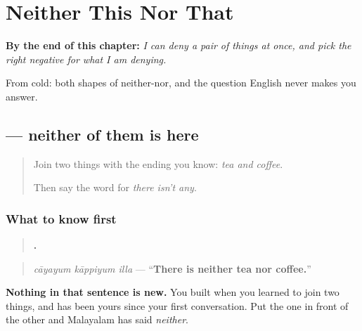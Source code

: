 
\chapter{Neither This Nor That}
\label{ch:ml-neither}

\begin{chapteropening}
\textbf{By the end of this chapter:} \emph{I can deny a pair of things at once, and pick the right negative for what I am denying.}

From cold: both shapes of neither-nor, and the question English never makes you answer.
\end{chapteropening}

\section[\texorpdfstring{\ml{ചായയും} \ml{കാപ്പിയും} \ml{ഇല്ല} (caayayum …)}{ചായയും കാപ്പിയും ഇല്ല (caayayum …)}]{   — neither of them is here}

\label{lesson:ML-C109-neither-here}



\begin{quote}
Join two things with the ending you know: \emph{tea and coffee}.

Then say the word for \emph{there isn't any}.
\end{quote}

\subsection*{What to know first}
\begin{quote}
\textbf{  .}
\end{quote}

\begin{quote}
\emph{cāyayum kāppiyum illa} — \textquotedblleft{}\textbf{There is neither tea nor coffee.}\textquotedblright{}
\end{quote}

\textbf{Nothing in that sentence is new.} You built \textbf{ } when you learned to join two things, and \textbf{} has been yours since your first conversation. Put the one in front of the other and Malayalam has said \emph{neither}.

